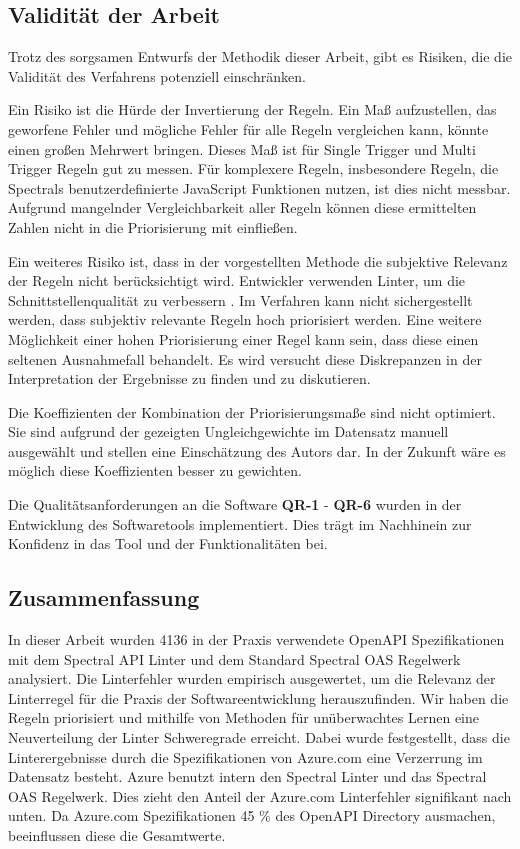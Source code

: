 \subsection{Validität der Arbeit} \label{sec:validitätdesverfahrens}
  Trotz des sorgsamen Entwurfs der Methodik dieser Arbeit, gibt es Risiken, die die Validität des Verfahrens potenziell einschränken.

  Ein Risiko ist die Hürde der Invertierung der Regeln. Ein Maß aufzustellen, das geworfene Fehler und mögliche Fehler für alle Regeln vergleichen kann, könnte einen großen Mehrwert bringen. Dieses Maß ist für Single Trigger und Multi Trigger Regeln gut zu messen. Für komplexere Regeln, insbesondere Regeln, die Spectrals benutzerdefinierte JavaScript Funktionen nutzen, ist dies nicht messbar. Aufgrund mangelnder Vergleichbarkeit aller Regeln können diese ermittelten Zahlen nicht in die Priorisierung mit einfließen.

  Ein weiteres Risiko ist, dass in der vorgestellten Methode die subjektive Relevanz der Regeln nicht berücksichtigt wird. Entwickler verwenden Linter, um die Schnittstellenqualität zu verbessern \parencite{tomasdottir_adoption_2018}. Im Verfahren kann nicht sichergestellt werden, dass subjektiv relevante Regeln hoch priorisiert werden. Eine weitere Möglichkeit einer hohen Priorisierung einer Regel kann sein, dass diese einen seltenen Ausnahmefall behandelt. Es wird versucht diese Diskrepanzen in der Interpretation der Ergebnisse zu finden und zu diskutieren.

  Die Koeffizienten der Kombination der Priorisierungsmaße sind nicht optimiert. Sie sind aufgrund der gezeigten Ungleichgewichte im Datensatz manuell ausgewählt und stellen eine Einschätzung des Autors dar. In der Zukunft wäre es möglich diese Koeffizienten besser zu gewichten.

  Die Qualitätsanforderungen an die Software \textbf{QR-1} - \textbf{QR-6} wurden in der Entwicklung des Softwaretools implementiert. Dies trägt im Nachhinein zur Konfidenz in das Tool und der Funktionalitäten bei.

\subsection{Zusammenfassung} \label{sec:zusammenfassung}
  In dieser Arbeit wurden 4136 in der Praxis verwendete OpenAPI Spezifikationen mit dem Spectral API Linter und dem Standard Spectral OAS Regelwerk analysiert. Die Linterfehler wurden empirisch ausgewertet, um die Relevanz der Linterregel für die Praxis der Softwareentwicklung herauszufinden. Wir haben die Regeln priorisiert und mithilfe von Methoden für unüberwachtes Lernen eine Neuverteilung der Linter Schweregrade erreicht. Dabei wurde festgestellt, dass die Linterergebnisse durch die Spezifikationen von Azure.com eine Verzerrung im Datensatz besteht. Azure benutzt intern den Spectral Linter und das Spectral \acs{OAS} Regelwerk. Dies zieht den Anteil der Azure.com Linterfehler signifikant nach unten. Da Azure.com Spezifikationen 45 \% des OpenAPI Directory ausmachen, beeinflussen diese die Gesamtwerte. 
  
